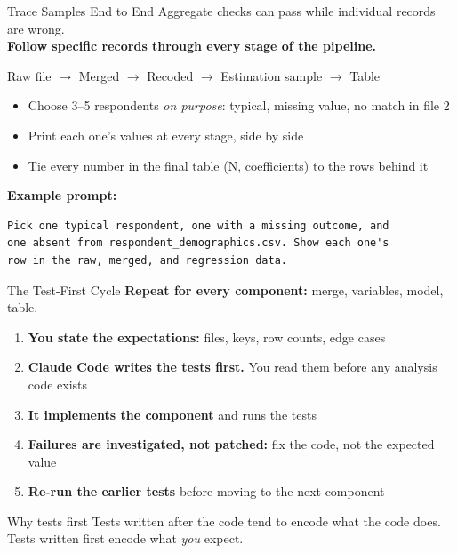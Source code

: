 \documentclass[aspectratio=169, 11pt]{beamer}
\begin{document}
\begin{frame}[fragile]{Trace Samples End to End}
  Aggregate checks can pass while individual records are wrong.\\
  \textbf{Follow specific records through every stage of the pipeline.}

  \vspace{0.3em}
  \centering
  Raw file $\rightarrow$ Merged $\rightarrow$ Recoded $\rightarrow$ Estimation sample $\rightarrow$ Table
  \raggedright

  \vspace{0.3em}
  \begin{itemize}
    \item Choose 3--5 respondents \textit{on purpose}: typical, missing value, no match in file 2
    \item Print each one's values at every stage, side by side
    \item Tie every number in the final table (N, coefficients) to the rows behind it
  \end{itemize}

  \vspace{0.3em}
  \textbf{Example prompt:}
  \begin{lstlisting}[basicstyle=\ttfamily\footnotesize]
Pick one typical respondent, one with a missing outcome, and
one absent from respondent_demographics.csv. Show each one's
row in the raw, merged, and regression data.
  \end{lstlisting}
\end{frame}

\begin{frame}{The Test-First Cycle}
  \textbf{Repeat for every component:} merge, variables, model, table.

  \vspace{0.5em}
  \begin{enumerate}
    \item \textbf{You state the expectations:} files, keys, row counts, edge cases
    \item \textbf{Claude Code writes the tests first.} You read them before any analysis code exists
    \item \textbf{It implements the component} and runs the tests
    \item \textbf{Failures are investigated, not patched:} fix the code, not the expected value
    \item \textbf{Re-run the earlier tests} before moving to the next component
  \end{enumerate}

  \vspace{0.8em}
  \begin{block}{Why tests first}
    Tests written after the code tend to encode what the code does. Tests written first encode what \textit{you} expect.
  \end{block}
\end{frame}
\end{document}
